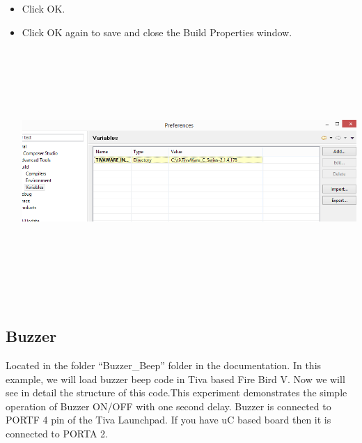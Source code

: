 \documentclass[a4paper,12pt,oneside]{article}
\begin{document}
\begin{itemize}
						\item  Click OK.
						\item  Click OK again to save and close
						the Build Properties window.\\
						\includegraphics[width=20cm,height=10cm]{Images/AddVariables9}
					\end{itemize}
		\subsection{ \textbf{Buzzer}}
		
			Located in the folder “Buzzer\_Beep” folder in the documentation.
			In this example, we will load buzzer beep code in Tiva based Fire Bird V. Now we will see in detail the structure of this code.This experiment demonstrates the simple operation of Buzzer ON/OFF with one second delay.
			Buzzer is connected to PORTF 4 pin of the Tiva Launchpad. If you have uC based board then it is connected to PORTA 2.
		
\end{document}
